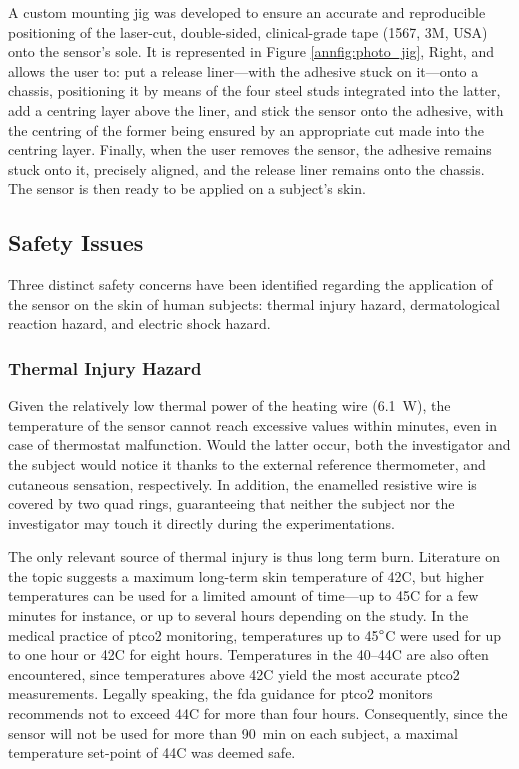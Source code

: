A custom mounting jig was developed to ensure an accurate and reproducible positioning of the laser-cut, double-sided, clinical-grade tape (1567, 3M, USA) onto the sensor's sole. It is represented in Figure \ref{annfig:photo_jig}, Right, and allows the user to:  put a release liner---with the adhesive stuck on it---onto a chassis, positioning it by means of the four steel studs integrated into the latter,  add a centring layer above the liner, and  stick the sensor onto the adhesive, with the centring of the former being ensured by an appropriate cut made into the centring layer. Finally, when  the user removes the sensor, the adhesive remains stuck onto it, precisely aligned, and the release liner remains onto the chassis. The sensor is then ready to be applied on a subject's skin.

\subsection{Safety Issues}\label{annsect:safety_issue}

Three distinct safety concerns have been identified regarding the application of the sensor on the skin of human subjects: thermal injury hazard, dermatological reaction hazard, and electric shock hazard.

\subsubsection{Thermal Injury Hazard}\label{annsect:temp_harm}

Given the relatively low thermal power of the heating wire (6.1~W), the temperature of the sensor cannot reach excessive values within minutes, even in case of thermostat malfunction. Would the latter occur, both the investigator and the subject would notice it thanks to the external reference thermometer, and cutaneous sensation, respectively. In addition, the enamelled resistive wire is covered by two quad rings, guaranteeing that neither the subject nor the investigator may touch it directly during the experimentations.

The only relevant source of thermal injury is thus long term burn. Literature on the topic suggests a maximum long-term skin temperature of 42{\degree}C, but higher temperatures can be used for a limited amount of time---up to 45{\degree}C for a few minutes for instance\cite{lawrence1976}, or up to several hours depending on the study\cite{moritz1947}. In the medical practice of \gls{ptco2} monitoring, temperatures up to 45$\degree$C were used for up to one hour\cite{wimberley1985a} or 42{\degree}C for eight hours\cite{bendjelid2005}. Temperatures in the 40--44{\degree}C are also often encountered, since temperatures above 42{\degree}C yield the most accurate \gls{ptco2} measurements\cite{conway2018}. Legally speaking, the \gls{fda} guidance for \gls{ptco2} monitors recommends not to exceed 44{\degree}C for more than four hours\cite{fda_transcut}. Consequently, since the sensor will not be used for more than 90~min on each subject, a maximal temperature set-point of 44{\degree}C was deemed safe.

